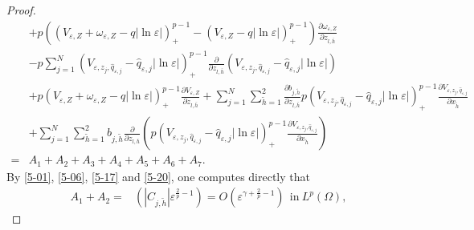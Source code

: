 \documentclass[12pt,reqno]{amsart}
\numberwithin{equation}{section}
\theoremstyle{definition}
\theoremstyle{remark}
\begin{document}
\begin{proof}
\begin{equation}
\begin{split}
&+p\left( \left( V_{\varepsilon,Z}+\omega_{\varepsilon,Z}-q|\ln\varepsilon|\right)^{p-1}_+-\left( V_{\varepsilon,Z} -q|\ln\varepsilon|\right)^{p-1}_+\right) \frac{\partial\omega_{\varepsilon,Z}}{\partial z_{l,\bar{h}}}\\
&-p\sum_{j=1}^N\left (V_{\varepsilon, z_j, \hat{q}_{\varepsilon,j}}-\hat{q}_{\varepsilon,j}|\ln\varepsilon|\right )^{p-1}_+\frac{\partial }{\partial z_{l,\bar{h}}}\left (V_{\varepsilon, z_j, \hat{q}_{\varepsilon,j}}-\hat{q}_{\varepsilon,j}|\ln\varepsilon|\right )   \\
&+p\left (V_{\varepsilon,Z}+\omega_{\varepsilon,Z}-q|\ln\varepsilon|\right )^{p-1}_+\frac{\partial V_{\varepsilon,Z}}{\partial z_{l,\bar{h}}}+\sum_{j=1}^N\sum_{\tilde{h}=1}^2\frac{\partial b_{j,\tilde{h}}}{\partial z_{l,\bar{h}}}p\left(   V_{\varepsilon, z_j, \hat{q}_{\varepsilon,j}}-\hat{q}_{\varepsilon,j}|\ln\varepsilon| \right )^{p-1}_+\frac{\partial V_{\varepsilon, z_j, \hat{q}_{\varepsilon,j}}}{\partial x_{\tilde{h}}}\\
&+\sum_{j=1}^N\sum_{\tilde{h}=1}^2b_{j,\tilde{h}}\frac{\partial }{\partial z_{l,\bar{h}}}\left( p\left(   V_{\varepsilon, z_j, \hat{q}_{\varepsilon,j}}-\hat{q}_{\varepsilon,j}|\ln\varepsilon| \right )^{p-1}_+\frac{\partial V_{\varepsilon, z_j, \hat{q}_{\varepsilon,j}}}{\partial x_{\tilde{h}}}\right) \\
=&A_1+A_2+A_3+A_4+A_5+A_6+A_7.
\end{split}
\end{equation}
By \eqref{5-01}, \eqref{5-06}, \eqref{5-17} and \eqref{5-20}, one computes directly that
\begin{equation*}
\begin{split}
A_1+A_2=&\left( |C_{j,\tilde{h}}|\varepsilon^{\frac{2}{p}-1}\right)=O\left(  \varepsilon^{\gamma+\frac{2}{p}-1}\right)\ \ \text{in}\ L^p(\Omega),
\end{split}

\end{equation*}
\end{proof}
\end{document}
